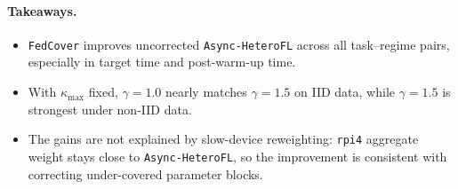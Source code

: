 \paragraph{Takeaways.}

\begin{itemize}[leftmargin=*, nosep]
  \item \texttt{FedCover} improves uncorrected \texttt{Async-HeteroFL} across all task--regime pairs, especially in target time and post-warm-up time.
  \item With \(\kappa_{\max}\) fixed, \(\gamma=1.0\) nearly matches \(\gamma=1.5\) on IID data, while \(\gamma=1.5\) is strongest under non-IID data.
  \item The gains are not explained by slow-device reweighting: \texttt{rpi4} aggregate weight stays close to \texttt{Async-HeteroFL}, so the improvement is consistent with correcting under-covered parameter blocks.
\end{itemize}

\FloatBarrier



